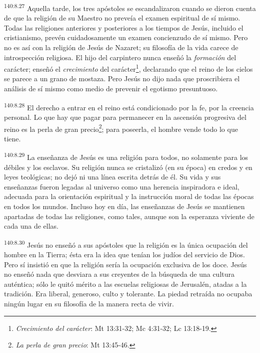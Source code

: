 \par
\textsuperscript{140:8.27} Aquella tarde, los tres apóstoles se escandalizaron cuando se dieron cuenta de que la religión de su Maestro no preveía el examen espiritual de sí mismo. Todas las religiones anteriores y posteriores a los tiempos de Jesús, incluido el cristianismo, prevén cuidadosamente un examen concienzudo de sí mismo. Pero no es así con la religión de Jesús de Nazaret; su filosofía de la vida carece de introspección religiosa. El hijo del carpintero nunca enseñó la \textit{formación} del carácter; enseñó el \textit{crecimiento} del carácter\footnote{\textit{Crecimiento del carácter}: Mt 13:31-32; Mc 4:31-32; Lc 13:18-19.}, declarando que el reino de los cielos se parece a un grano de mostaza. Pero Jesús no dijo nada que proscribiera el análisis de sí mismo como medio de prevenir el egotismo presuntuoso.

\par
\textsuperscript{140:8.28} El derecho a entrar en el reino está condicionado por la fe, por la creencia personal. Lo que hay que pagar para permanecer en la ascensión progresiva del reino es la perla de gran precio\footnote{\textit{La perla de gran precio}: Mt 13:45-46.}; para poseerla, el hombre vende todo lo que tiene.

\par
\textsuperscript{140:8.29} La enseñanza de Jesús es una religión para todos, no solamente para los débiles y los esclavos. Su religión nunca se cristalizó (en su época) en credos y en leyes teológicas; no dejó ni una línea escrita detrás de él. Su vida y sus enseñanzas fueron legadas al universo como una herencia inspiradora e ideal, adecuada para la orientación espiritual y la instrucción moral de todas las épocas en todos los mundos. Incluso hoy en día, las enseñanzas de Jesús se mantienen apartadas de todas las religiones, como tales, aunque son la esperanza viviente de cada una de ellas.

\par
\textsuperscript{140:8.30} Jesús no enseñó a sus apóstoles que la religión es la única ocupación del hombre en la Tierra; ésta era la idea que tenían los judíos del servicio de Dios. Pero sí insistió en que la religión sería la ocupación exclusiva de los doce. Jesús no enseñó nada que desviara a sus creyentes de la búsqueda de una cultura auténtica; sólo le quitó mérito a las escuelas religiosas de Jerusalén, atadas a la tradición. Era liberal, generoso, culto y tolerante. La piedad retraída no ocupaba ningún lugar en su filosofía de la manera recta de vivir.

